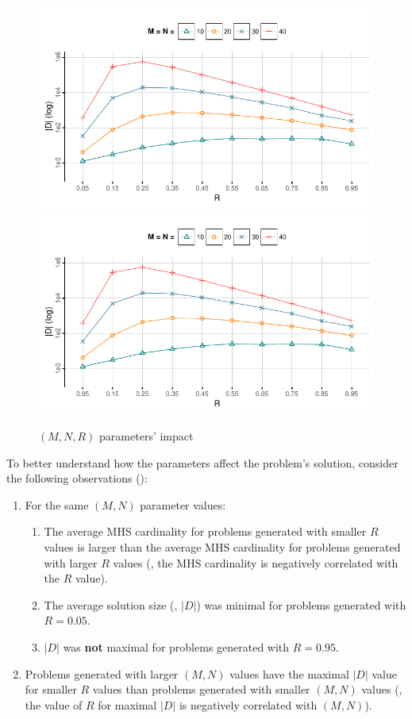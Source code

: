 \begin{figure}[!ht]
  \includegraphics[trim=0em 3em 1em 0em, clip, page=1]{figures/mhs2/figures/optim_small2}
  \\[0.3em]
  \includegraphics[trim=0em 0.5em 1em 4em, clip, page=2]{figures/mhs2/figures/optim_small2}
  \caption{$(M,N,R)$ parameters' impact\label{fig:parameters-impact}}
\end{figure}
%
To better understand how the parameters affect the problem's solution,
consider the following observations ():
\begin{enumerate}
\item For the same $(M,N)$ parameter values:
  \begin{enumerate}
  \item The average \ac{MHS} cardinality for problems generated with
    smaller $R$ values is larger than the average \ac{MHS} cardinality
    for problems generated with larger $R$ values (\ie, the \ac{MHS}
    cardinality is negatively correlated with the $R$ value).
  \item The average solution size (\ie, $|D|$) was minimal for
    problems generated with $R=0.05$.
  \item  $|D|$ was \textbf{not}
    maximal for problems generated with $R=0.95$.
  \end{enumerate}
\item Problems generated with larger $(M,N)$ values have the maximal
  $|D|$ value for smaller $R$ values than problems generated with
  smaller $(M,N)$ values (\ie, the value of $R$ for maximal $|D|$ is
  negatively correlated with $(M,N)$).
\end{enumerate}

